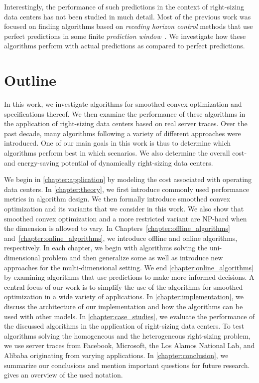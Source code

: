 Interestingly, the performance of such predictions in the context of right-sizing data centers has not been studied in much detail. Most of the previous work was focused on finding algorithms based on \emph{receding horizon control} methods that use perfect predictions in some finite \emph{prediction window}~\cite{Lin2012, Chen2015, Badiei2015, Chen2016, Li2018, Lin2019}. We investigate how these algorithms perform with actual predictions as compared to perfect predictions.

\section{Outline}

In this work, we investigate algorithms for smoothed convex optimization and specifications thereof. We then examine the performance of these algorithms in the application of right-sizing data centers based on real server traces. Over the past decade, many algorithms following a variety of different approaches were introduced. One of our main goals in this work is thus to determine which algorithms perform best in which scenarios. We also determine the overall cost- and energy-saving potential of dynamically right-sizing data centers.

We begin in \cref{chapter:application} by modeling the cost associated with operating data centers. In \cref{chapter:theory}, we first introduce commonly used performance metrics in algorithm design. We then formally introduce smoothed convex optimization and its variants that we consider in this work. We also show that smoothed convex optimization and a more restricted variant are NP-hard when the dimension is allowed to vary. In Chapters~\ref{chapter:offline_algorithms} and~\ref{chapter:online_algorithms}, we introduce offline and online algorithms, respectively. In each chapter, we begin with algorithms solving the uni-dimensional problem and then generalize some as well as introduce new approaches for the multi-dimensional setting. We end \cref{chapter:online_algorithms} by examining algorithms that use predictions to make more informed decisions. A central focus of our work is to simplify the use of the algorithms for smoothed optimization in a wide variety of applications. In \cref{chapter:implementation}, we discuss the architecture of our implementation and how the algorithms can be used with other models. In \cref{chapter:case_studies}, we evaluate the performance of the discussed algorithms in the application of right-sizing data centers. To test algorithms solving the homogeneous and the heterogeneous right-sizing problem, we use server traces from Facebook, Microsoft, the Los Alamos National Lab, and Alibaba originating from varying applications. In \cref{chapter:conclusion}, we summarize our conclusions and mention important questions for future research.  gives an overview of the used notation.

